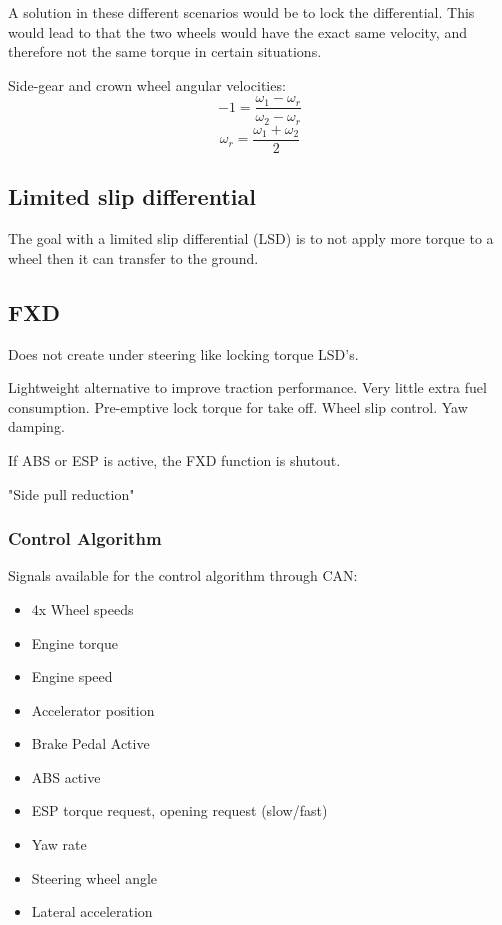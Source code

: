 A solution in these different scenarios would be to lock the differential. This would lead to that the two wheels would have the exact same velocity, and therefore not the same torque in certain situations. 

Side-gear and crown wheel angular velocities:
\begin{equation}
	-1 = \frac{\omega_{1} - \omega_{r}}{\omega_{2} - \omega_{r}}
\end{equation}
\begin{equation}
	\omega_{r} = \frac{\omega_{1} + \omega_{2}}{2}
\end{equation}



\subsection{Limited slip differential}

The goal with a limited slip differential (LSD) is to not apply more torque to a wheel then it can transfer to the ground.

\subsection{FXD}

Does not create under steering like locking torque LSD's. 

Lightweight alternative  to improve traction performance. Very little extra fuel consumption. Pre-emptive lock torque for take off. Wheel slip control. Yaw damping. 

If ABS or ESP is active, the FXD function is shutout. 

"Side pull reduction"


\subsubsection{Control Algorithm}

Signals available for the control algorithm through CAN:
\begin{itemize}
	\item 4x Wheel speeds
	\item Engine torque
	\item Engine speed
	\item Accelerator position
	\item Brake Pedal Active
	\item ABS active
	\item ESP torque request, opening request (slow/fast)
	\item Yaw rate
	\item Steering wheel angle
	\item Lateral acceleration
\end{itemize}

